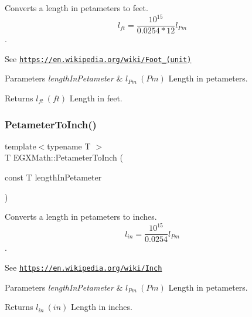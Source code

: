 Converts a length in petameters to feet. \[ l_{ft}= \frac{10^{15}}{0.0254 * 12} l_{Pm} \]. 

See \href{https://en.wikipedia.org/wiki/Foot_(unit)}{\tt https\+://en.\+wikipedia.\+org/wiki/\+Foot\+\_\+(unit)} 
\begin{DoxyParams}{Parameters}
{\em length\+In\+Petameter} & $ l_{Pm}\ (Pm)$ Length in petameters. \\
\hline
\end{DoxyParams}
\begin{DoxyReturn}{Returns}
$ l_{ft}\ (ft)$ Length in feet. 
\end{DoxyReturn}
\mbox{\label{group___e_g_x_math-_conversions-_length_conversions-_petameter-_imperial_ga8e0128613c738b54c64e5bdd37f41b5b}} 
\subsubsection{\texorpdfstring{Petameter\+To\+Inch()}{PetameterToInch()}}
{\footnotesize\ttfamily template$<$typename T $>$ \\
T E\+G\+X\+Math\+::\+Petameter\+To\+Inch (\begin{DoxyParamCaption}\item[{const T}]{length\+In\+Petameter }\end{DoxyParamCaption})}



Converts a length in petameters to inches. \[ l_{in}= \frac{10^{15}}{0.0254} l_{Pm} \]. 

See \href{https://en.wikipedia.org/wiki/Inch}{\tt https\+://en.\+wikipedia.\+org/wiki/\+Inch} 
\begin{DoxyParams}{Parameters}
{\em length\+In\+Petameter} & $ l_{Pm}\ (Pm)$ Length in petameters. \\
\hline
\end{DoxyParams}
\begin{DoxyReturn}{Returns}
$ l_{in}\ (in)$ Length in inches. 
\end{DoxyReturn}
\mbox{\label{group___e_g_x_math-_conversions-_length_conversions-_petameter-_imperial_ga044a0e99c9e8335dc196daf1efb9c90f}} 
